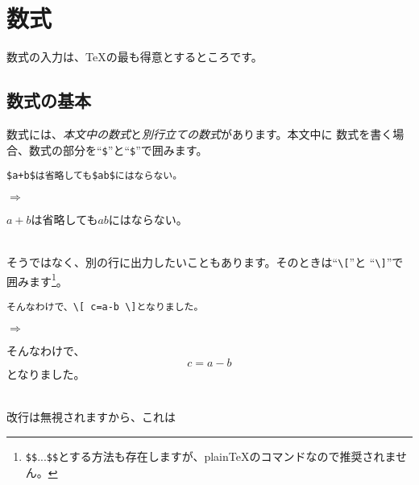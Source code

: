 
\section{数式}
数式の入力は、{\TeX}の最も得意とするところです。

\subsection{数式の基本}
数式には、\emph{本文中の数式}と\emph{別行立ての数式}があります。本文中に
数式を書く場合、数式の部分を``\verb+$+''と``\verb+$+''で囲みます。
\begin{minipage}[c]{.50\textwidth}
\begin{screen}
\small
\begin{verbatim}
$a+b$は省略しても$ab$にはならない。
\end{verbatim}
\end{screen}
\end{minipage}%
$\Rightarrow$
\begin{minipage}{.45\textwidth}
\begin{shadebox}
$a+b$は省略しても$ab$にはならない。
\end{shadebox}
\end{minipage}
\vspace*{1mm}\\
そうではなく、別の行に出力したいこともあります。そのときは``\verb+\[+''と
``\verb+\]+''で囲みます\footnote{\verb+$$+...\verb+$$+とする方法も存在しますが、plain{\TeX}のコマンドなので推奨されません。}。\\
\begin{minipage}[c]{.50\textwidth}
\begin{screen}
\small
\begin{verbatim}
そんなわけで、\[ c=a-b \]となりました。
\end{verbatim}
\end{screen}
\end{minipage}%
$\Rightarrow$
\begin{minipage}{.45\textwidth}
\begin{shadebox}
そんなわけで、\[ c=a-b \]となりました。
\end{shadebox}
\end{minipage}
\vspace*{1mm}\\
改行は無視されますから、これは\\
